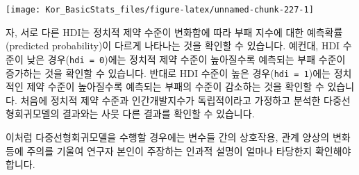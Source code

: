 \documentclass[]{book}
\begin{document}
\begin{center}\texttt{[image: Kor\_BasicStats\_files/figure-latex/unnamed-chunk-227-1]} \end{center}

자, 서로 다른 HDI는 정치적 제약 수준이 변화함에 따라 부패 지수에 대한 예측확률(predicted probability)이 다르게 나타나는 것을 확인할 수 있습니다. 예컨대, HDI 수준이 낮은 경우(\texttt{hdi\ =\ 0})에는 정치적 제약 수준이 높아질수록 예측되는 부패 수준이 증가하는 것을 확인할 수 있습니다. 반대로 HDI 수준이 높은 경우(\texttt{hdi\ =\ 1})에는 정치적인 제약 수준이 높아질수록 예측되는 부패의 수준이 감소하는 것을 확인할 수 있습니다. 처음에 정치적 제약 수준과 인간개발지수가 독립적이라고 가정하고 분석한 다중선형회귀모델의 결과와는 사뭇 다른 결과를 확인할 수 있습니다.

이처럼 다중선형회귀모델을 수행할 경우에는 변수들 간의 상호작용, 관계 양상의 변화 등에 주의를 기울여 연구자 본인이 주장하는 인과적 설명이 얼마나 타당한지 확인해야 합니다.


\end{document}
